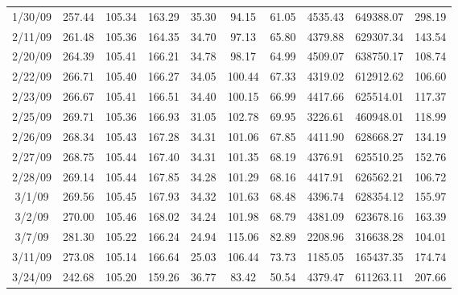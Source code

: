 \documentclass[12pt,a4paper]{report}
\begin{document}
\begin{longtable}[c]{| c | c | c |c |c |c |c |c |c |c |}
1/30/09       & 257.44       & 105.34       & 163.29      & 35.30           & 94.15        & 61.05        & 4535.43      & 649388.07    & 298.19       \\
2/11/09       & 261.48       & 105.36       & 164.35      & 34.70           & 97.13        & 65.80        & 4379.88      & 629307.34    & 143.54       \\
2/20/09       & 264.39       & 105.41       & 166.21      & 34.78           & 98.17        & 64.99        & 4509.07      & 638750.17    & 108.74       \\
2/22/09       & 266.71       & 105.40       & 166.27      & 34.05           & 100.44       & 67.33        & 4319.02      & 612912.62    & 106.60       \\
2/23/09       & 266.67       & 105.41       & 166.51      & 34.40           & 100.15       & 66.99        & 4417.66      & 625514.01    & 117.37       \\
2/25/09       & 269.71       & 105.36       & 166.93      & 31.05           & 102.78       & 69.95        & 3226.61      & 460948.01    & 118.99       \\
2/26/09       & 268.34       & 105.43       & 167.28      & 34.31           & 101.06       & 67.85        & 4411.90      & 628668.27    & 134.19       \\
2/27/09       & 268.75       & 105.44       & 167.40      & 34.31           & 101.35       & 68.19        & 4376.91      & 625510.25    & 152.76       \\
2/28/09       & 269.14       & 105.44       & 167.85      & 34.28           & 101.29       & 68.16        & 4417.91      & 626562.21    & 106.72       \\
3/1/09        & 269.56       & 105.45       & 167.93      & 34.32           & 101.63       & 68.48        & 4396.74      & 628354.12    & 155.97       \\
3/2/09        & 270.00       & 105.46       & 168.02      & 34.24           & 101.98       & 68.79        & 4381.09      & 623678.16    & 163.39       \\
3/7/09        & 281.30       & 105.22       & 166.24      & 24.94           & 115.06       & 82.89        & 2208.96      & 316638.28    & 104.01       \\
3/11/09       & 273.08       & 105.14       & 166.64      & 25.03           & 106.44       & 73.73        & 1185.05      & 165437.35    & 174.74       \\
3/24/09       & 242.68       & 105.20       & 159.26      & 36.77           & 83.42        & 50.54        & 4379.47      & 611263.11    & 207.66       \\

\end{longtable}
\end{document}
